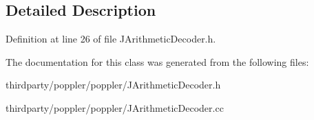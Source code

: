 \subsection{Detailed Description}


Definition at line 26 of file J\+Arithmetic\+Decoder.\+h.



The documentation for this class was generated from the following files\+:\begin{DoxyCompactItemize}
\item 
thirdparty/poppler/poppler/J\+Arithmetic\+Decoder.\+h\item 
thirdparty/poppler/poppler/J\+Arithmetic\+Decoder.\+cc\end{DoxyCompactItemize}
